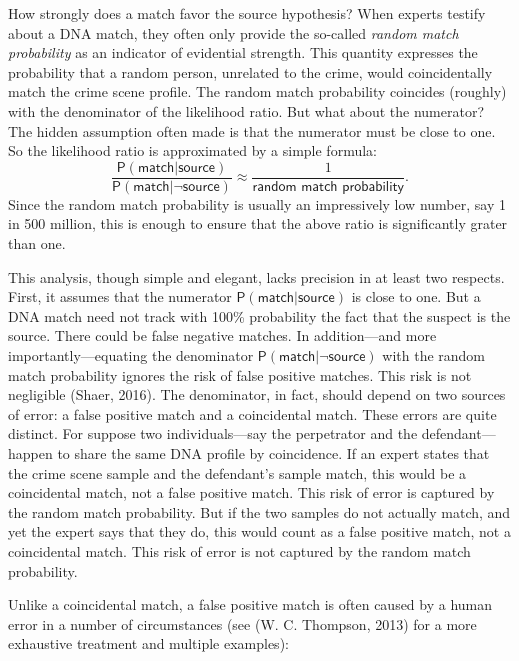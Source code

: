 \documentclass[
  10pt,
  dvipsnames,enabledeprecatedfontcommands]{scrartcl}
\newcommand{\pr}[1]{\mathsf{P}(#1)}
\begin{document}
How strongly does a match favor the source hypothesis? When experts
testify about a DNA match, they often only provide the so-called
\emph{random match probability} as an indicator of evidential strength.
This quantity expresses the probability that a random person, unrelated
to the crime, would coincidentally match the crime scene profile. The
random match probability coincides (roughly) with the denominator of the
likelihood ratio. But what about the numerator? The hidden assumption
often made is that the numerator must be close to one. So the likelihood
ratio is approximated by a simple formula:
\[\frac{\pr{\textsf{match} \vert \textsf{source}}}{\pr{\textsf{match} \vert \neg \textsf{source}}}\approx\frac{1}{\textsf{random match probability}}.\]
Since the random match probability is usually an impressively low
number, say 1 in 500 million, this is enough to ensure that the above
ratio is significantly grater than one.

This analysis, though simple and elegant, lacks precision in at least
two respects. First, it assumes that the numerator
\(\pr{\textsf{match} \vert \textsf{source}}\) is close to one. But a DNA
match need not track with 100\% probability the fact that the suspect is
the source. There could be false negative matches. In addition---and
more importantly---equating the denominator
\(\pr{\textsf{match} \vert \neg \textsf{source}}\) with the random match
probability ignores the risk of false positive matches. This risk is not
negligible (Shaer, 2016). The denominator, in fact, should depend on two
sources of error: a false positive match and a coincidental match. These
errors are quite distinct. For suppose two individuals---say the
perpetrator and the defendant---happen to share the same DNA profile by
coincidence. If an expert states that the crime scene sample and the
defendant's sample match, this would be a coincidental match, not a
false positive match. This risk of error is captured by the random match
probability. But if the two samples do not actually match, and yet the
expert says that they do, this would count as a false positive match,
not a coincidental match. This risk of error is not captured by the
random match probability.

Unlike a coincidental match, a false positive match is often caused by a
human error in a number of circumstances (see (W. C. Thompson, 2013) for
a more exhaustive treatment and multiple examples):
\end{document}
